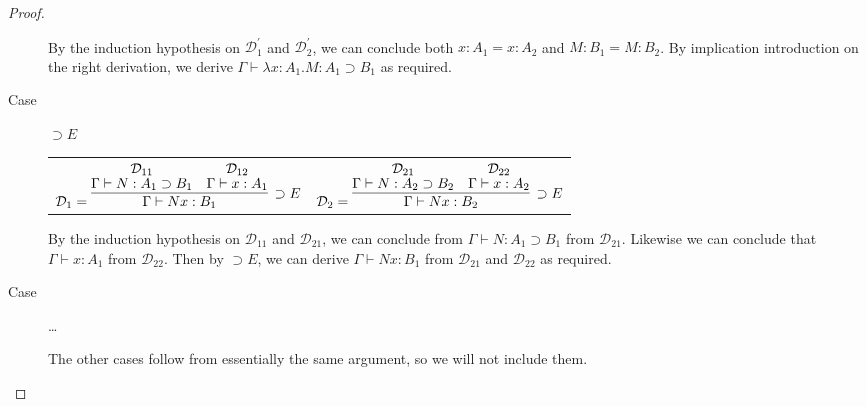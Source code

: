\documentclass[11pt,letterpaper]{article}
\newcommand{\D}{\mathcal{D}}
\newcommand{\proves}{\vdash}
\renewcommand{\implies}{\supset}
\begin{document}
\begin{proof}
\begin{description}
            By the induction hypothesis on $\D_1^\prime$ and $\D_2^\prime$, we
            can conclude both $x : A_1 = x : A_2$ and $M : B_1 = M : B_2$. By
            implication introduction on the right derivation, we derive $\Gamma
            \proves \lambda x : A_1 . M : A_1 \implies B_1$ as required.

        \item[Case] $\implies E$

            \begin{center}
                \begin{tabular}{cc}
                    $
                    \mathcal{D}_1 = \infer[\implies E]{
                        \Gamma \proves N x : B_1
                    }{
                        \deduce[\mathcal{D}_{11}]{
                            \Gamma \proves N : A_1 \implies B_1
                        }{}
                        &
                        \deduce[\mathcal{D}_{12}]{
                            \Gamma \proves x : A_1
                        }{}
                    }
                    $
                    &
                    $
                    \mathcal{D}_2 = \infer[\implies E]{
                        \Gamma \proves N x : B_2
                    }{
                        \deduce[\mathcal{D}_{21}]{
                            \Gamma \proves N : A_2 \implies B_2
                        }{}
                        &
                        \deduce[\mathcal{D}_{22}]{
                            \Gamma \proves x : A_2
                        }{}
                    }
                    $
                \end{tabular}
            \end{center}

            By the induction hypothesis on $\mathcal{D}_{11}$ and
            $\mathcal{D}_{21}$, we can conclude from $\Gamma \proves N : A_1
            \implies B_1$ from $\mathcal{D}_{21}$. Likewise we can conclude
            that $\Gamma \proves x : A_1$ from $\mathcal{D}_{22}$. Then by
            $\implies E$, we can derive $\Gamma \proves N x : B_1$ from
            $\mathcal{D}_{21}$ and $\mathcal{D}_{22}$ as required.

        \item[Case] \ldots

            The other cases follow from essentially the same argument, so we
            will not include them.

    \end{description}
\end{proof}
\end{document}
